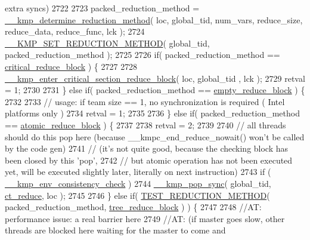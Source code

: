 \begin{DoxyCode}
{{       extra syncs)}
2722 
2723     packed\_reduction\_method = \hyperlink{kmp_8h_a7735d7d58a02a05dbfebda565f97c80c}{\_\_kmp\_determine\_reduction\_method}( loc, 
      global\_tid, num\_vars, reduce\_size, reduce\_data, reduce\_func, lck );
2724     \hyperlink{kmp__csupport_8c_a7a13f1fc7eb548d763de215bd7cdcf51}{\_\_KMP\_SET\_REDUCTION\_METHOD}( global\_tid, packed\_reduction\_method );
2725 
2726     \textcolor{keywordflow}{if}( packed\_reduction\_method == \hyperlink{kmp_8h_aef090e4cbee673db380b81f6deb8e306a2c5ad9d5d2b242bce894255d63ee550e}{critical\_reduce\_block} ) \{
2727 
2728         \hyperlink{kmp__csupport_8c_ad97140748ff9336db068d58f950a4850}{\_\_kmp\_enter\_critical\_section\_reduce\_block}( loc, global\_tid
      , lck );
2729         retval = 1;
2730 
2731     \} \textcolor{keywordflow}{else} \textcolor{keywordflow}{if}( packed\_reduction\_method == \hyperlink{kmp_8h_aef090e4cbee673db380b81f6deb8e306a28cf3671c5c01e773c7040204b6e8bb5}{empty\_reduce\_block} ) \{
2732 
2733         \textcolor{comment}{// usage: if team size == 1, no synchronization is required ( Intel platforms only )}
2734         retval = 1;
2735 
2736     \} \textcolor{keywordflow}{else} \textcolor{keywordflow}{if}( packed\_reduction\_method == \hyperlink{kmp_8h_aef090e4cbee673db380b81f6deb8e306ae4e1bd6637deb8f7d8098584a432aa0b}{atomic\_reduce\_block} ) \{
2737 
2738         retval = 2;
2739 
2740         \textcolor{comment}{// all threads should do this pop here (because \_\_kmpc\_end\_reduce\_nowait() won't be called by the
       code gen)}
2741         \textcolor{comment}{//     (it's not quite good, because the checking block has been closed by this 'pop',}
2742         \textcolor{comment}{//      but atomic operation has not been executed yet, will be executed slightly later, literally
       on next instruction)}
2743         \textcolor{keywordflow}{if} ( \hyperlink{kmp_8h_ab4062d4f566c901230e51490a8819ba0}{\_\_kmp\_env\_consistency\_check} )
2744             \hyperlink{kmp__error_8c_ab716717d70650eeeb205b057232d7c1c}{\_\_kmp\_pop\_sync}( global\_tid, \hyperlink{kmp_8h_a1582e7ddc609220a660d10244ef3e315a69ad53348e0bb90d6e3adee6345553ca}{ct\_reduce}, loc );
2745 
2746     \} \textcolor{keywordflow}{else} \textcolor{keywordflow}{if}( \hyperlink{kmp_8h_a8e31af7b50c35efd630502d8cbe89cd3}{TEST\_REDUCTION\_METHOD}( packed\_reduction\_method, 
      \hyperlink{kmp_8h_aef090e4cbee673db380b81f6deb8e306a7e21547b06d81d12a9b3293f3059b973}{tree\_reduce\_block} ) ) \{
2747 
2748         \textcolor{comment}{//AT: performance issue: a real barrier here}
2749         \textcolor{comment}{//AT:     (if master goes slow, other threads are blocked here waiting for the master to come and
}}
\end{DoxyCode}
